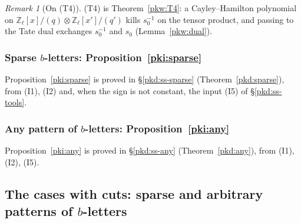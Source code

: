 \documentclass[10pt]{amsart}
\theoremstyle{definition}
\theoremstyle{remark}
\newtheorem{remark}[theorem]{Remark}
\newcommand{\Z}{\mathbb Z}
\begin{document}
\begin{remark}[On (T4)]\label{pkc:rem-T4}
(T4) is Theorem~\ref{pkw:T4}: a Cayley--Hamilton polynomial on
$\Z_\ell[x]/(q)\otimes\Z_\ell[x']/(q')$ kills $s_0^{-1}$ on the tensor product, and passing to the Tate
dual exchanges $s_0^{-1}$ and $s_0$ (Lemma~\ref{pkw:dual}).
\end{remark}

\subsubsection{Sparse $b$-letters: Proposition~\ref{pki:sparse}}\label{pkc:ss-sparse}

Proposition~\ref{pki:sparse} is proved in \S\ref{pkd:ss-sparse} (Theorem~\ref{pkd:sparse}), from
(I1), (I2) and, when the sign is not constant, the input (I5) of \S\ref{pkd:ss-tools}.

\subsubsection{Any pattern of $b$-letters: Proposition~\ref{pki:any}}\label{pkc:ss-any}

Proposition~\ref{pki:any} is proved in \S\ref{pkd:ss-any} (Theorem~\ref{pkd:any}), from (I1), (I2),
(I5).




\providecommand{\auO}{\mathcal O}
\providecommand{\panot}[1]{\par\smallskip{\raggedright\noindent\textbf{[Not proved here:} #1\textbf{]}\par}\smallskip}
\providecommand{\pllZf}{Z_f}
\providecommand{\plldef}{\delta^{\vee}}
\providecommand{\pglen}{\operatorname{len}}
\providecommand{\pkiWin}{\operatorname{Win}}
\providecommand{\pkiC}{\mathcal C}
\providecommand{\pkilog}{\operatorname{lg}}
\providecommand{\pkcPt}{\mathrm{Pt}}
\providecommand{\pkcimp}{\mathrm{imp}}
\providecommand{\pkcpd}{\mathrm{pd}}
\providecommand{\pkcdep}{\mathrm{dep}}
\providecommand{\pkcsh}{\mathrm{sh}}
\providecommand{\pkdco}{\mathrm{co}}
\providecommand{\pkdlg}{\mathrm{gd}}
\providecommand{\pkdstop}{\mathrm{stop}}
\providecommand{\pkdstd}{\mathrm{std}}
\providecommand{\pkdcost}{\mathrm{cost}}

\subsection{The cases with cuts: sparse and arbitrary patterns of $b$-letters}\label{pkd:sec}
\end{document}
